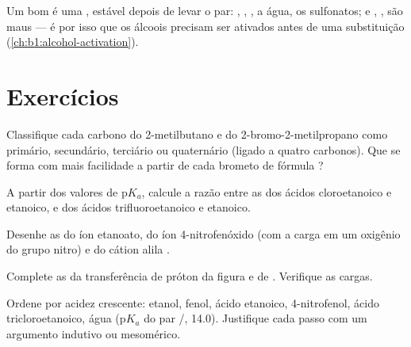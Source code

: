 Um bom  é uma , estável depois de levar o par:
, , , a água, os sulfonatos;  e ,
, são maus  --- é por isso que os álcoois
precisam ser ativados antes de uma substituição
(\cref{ch:b1:alcohol-activation}).

\section{Exercícios}

\begin{exercise}[$\star$]\label{exo:b1:electronic-effects:1}
Classifique cada carbono do 2-metilbutano e do 2-bromo-2-metilpropano
como primário, secundário, terciário ou quaternário (ligado a quatro
carbonos). Que  se forma com mais facilidade a partir de cada
brometo de fórmula ?
\end{exercise}

\begin{exercise}[$\star$]\label{exo:b1:electronic-effects:2}
A partir dos valores de $\mathrm{p}K_a$, calcule a razão entre as
 dos ácidos cloroetanoico e etanoico, e dos ácidos
trifluoroetanoico e etanoico.
\end{exercise}

\begin{exercise}[$\star$]\label{exo:b1:electronic-effects:3}
Desenhe as  do íon etanoato, do íon
4-nitrofenóxido (com a carga em um oxigênio do grupo nitro) e do cátion
alila .
\end{exercise}

\begin{exercise}[$\star$]\label{exo:b1:electronic-effects:4}
Complete as  da transferência de próton da figura e de
. Verifique as cargas.
\end{exercise}

\begin{exercise}[$\star\star$]\label{exo:b1:electronic-effects:5}
Ordene por acidez crescente: etanol, fenol, ácido etanoico,
4-nitrofenol, ácido tricloroetanoico, água ($\mathrm{p}K_a$ do par
/, 14.0). Justifique cada passo com um argumento
indutivo ou mesomérico.
\end{exercise}

